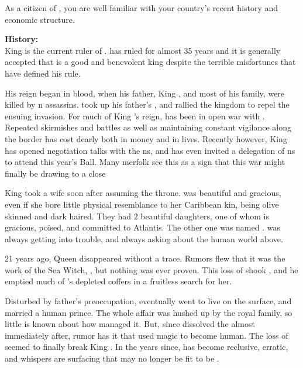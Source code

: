 \documentclass[blue]{NeptuneBall}
\begin{document}
\name{\bAtlantian{}}

As a citizen of \pAtlantis{}, you are well familiar with your country's recent history and economic structure.

{\bf History:}\\
King \cKing{\MYname{}} is the current ruler of \pAtlantis{}. \cKing{\They} has ruled for almost 35 years and it is generally accepted that \cKing{\they} is a good and benevolent king despite the terrible misfortunes that have defined his rule.

His reign began in blood, when his father, King \cExKing{\MYname{}}, and most of his family, were killed by \pPacifica{}n assassins. \cKing{\MYname{}} took up his father's \iTriton{\MYname{}}, and rallied the kingdom to repel the ensuing invasion. For much of King \cKing{\MYname{}}'s reign, \pAtlantis{} has been in open war with \pPacifica{}. Repeated skirmishes and battles as well as maintaining constant vigilance along the border has cost \pAtlantis{} dearly both in money and in lives. Recently however, King \cKing{\MYname{}} has opened negotiation talks with the \pPacifica{}ns, and has even invited a delegation of \pPacifica{}ns to attend this year's \cExExKing{} Ball. Many merfolk see this as a sign that this war might finally be drawing to a close

King \cKing{\MYname{}} took a wife soon after assuming the throne. \cQueen{\King} \cQueen{\MYname{}} was beautiful and gracious, even if she bore little physical resemblance to her Caribbean kin, being olive skinned and dark haired. They had 2 beautiful daughters, one of whom is gracious, poised, and committed to Atlantis. The other one was named \cAriel{\MYname{}}. \cAriel{\MYname{}} was always getting into trouble, and always asking about the human world above. 

21 years ago, Queen \cQueen{\MYname{}} disappeared without a trace. Rumors flew that it was the work of the Sea Witch, \cWitch{\MYname{}}, but nothing was ever proven.  This loss of \cKing{\their} \cQueen{\spouse{}} shook \cKing{}, and he emptied much of \pAtlantis{}'s depleted coffers in a fruitless search for her.

Disturbed by \cAriel{\them} father's preoccupation, \cAriel{} eventually went to live on the surface, and married a human prince. The whole affair was hushed up by the royal family, so little is known about how \cAriel{\they{}} managed it. But, since \cKing{} dissolved the \pMagician{} almost immediately after, rumor has it that \cAriel{\they} used magic to become human. The loss of \cAriel{} seemed to finally break King \cKing{\MYname{}}. In the years since, \cKing{\they{}} has become reclusive, erratic, and whispers are surfacing that \cKing{\they{}} may no longer be fit to be \cKing{\King}.
\end{document}
